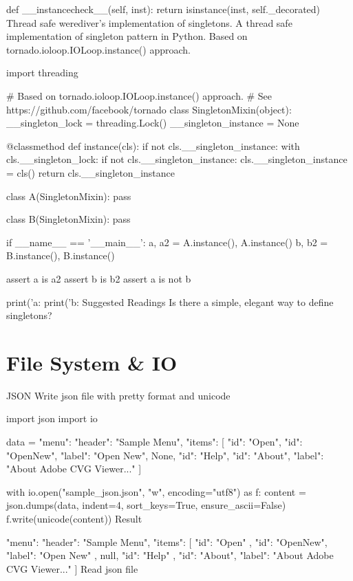     def __instancecheck__(self, inst):
        return isinstance(inst, self._decorated)
Thread safe
werediver's implementation of singletons. A thread safe implementation of singleton pattern in Python. Based on tornado.ioloop.IOLoop.instance() approach.

import threading

# Based on tornado.ioloop.IOLoop.instance() approach.
# See https://github.com/facebook/tornado
class SingletonMixin(object):
    __singleton_lock = threading.Lock()
    __singleton_instance = None

    @classmethod
    def instance(cls):
        if not cls.__singleton_instance:
            with cls.__singleton_lock:
                if not cls.__singleton_instance:
                    cls.__singleton_instance = cls()
        return cls.__singleton_instance

class A(SingletonMixin):
    pass

class B(SingletonMixin):
    pass

if __name__ == '__main__':
    a, a2 = A.instance(), A.instance()
    b, b2 = B.instance(), B.instance()

    assert a is a2
    assert b is b2
    assert a is not b

    print('a:  %
    print('b:  %
Suggested Readings
Is there a simple, elegant way to define singletons?

\section{File System & IO}

JSON
Write json file with pretty format and unicode

import json
import io

data = {
    "menu": {
        "header": "Sample Menu",
        "items": [
            {"id": "Open"},
            {"id": "OpenNew", "label": "Open New"},
            None,
            {"id": "Help"},
            {"id": "About", "label": "About Adobe CVG Viewer..."}
        ]
    }}

with io.open("sample_json.json", "w", encoding="utf8") as f:
    content = json.dumps(data, indent=4, sort_keys=True, ensure_ascii=False)
    f.write(unicode(content))
Result

{
    "menu": {
        "header": "Sample Menu",
        "items": [
            {
                "id": "Open"
            },
            {
                "id": "OpenNew",
                "label": "Open New"
            },
            null,
            {
                "id": "Help"
            },
            {
                "id": "About",
                "label": "About Adobe CVG Viewer..."
            }
        ]
    }
}
Read json file

